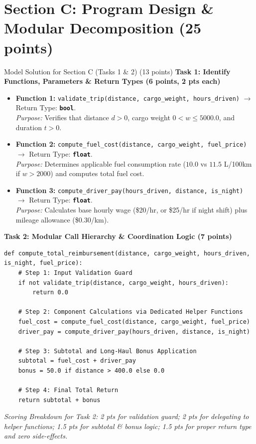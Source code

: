 \documentclass[11pt,a4paper]{article}
\begin{document}
\newpage

\section*{Section C: Program Design \& Modular Decomposition (25 points)}

\begin{solbox}{Model Solution for Section C (Tasks 1 \& 2) (13 points)}
\textbf{Task 1: Identify Functions, Parameters \& Return Types (6 points, 2 pts each)}
\begin{itemize}[leftmargin=2em, itemsep=2pt]
  \item \textbf{Function 1:} \texttt{validate\_trip(distance, cargo\_weight, hours\_driven)} $\rightarrow$ Return Type: \textbf{\texttt{bool}}.\\
    \textit{Purpose:} Verifies that distance $d > 0$, cargo weight $0 < w \le 5000.0$, and duration $t > 0$.
  \item \textbf{Function 2:} \texttt{compute\_fuel\_cost(distance, cargo\_weight, fuel\_price)} $\rightarrow$ Return Type: \textbf{\texttt{float}}.\\
    \textit{Purpose:} Determines applicable fuel consumption rate ($10.0$ vs $11.5$ L/100km if $w > 2000$) and computes total fuel cost.
  \item \textbf{Function 3:} \texttt{compute\_driver\_pay(hours\_driven, distance, is\_night)} $\rightarrow$ Return Type: \textbf{\texttt{float}}.\\
    \textit{Purpose:} Calculates base hourly wage (\$20/hr, or \$25/hr if night shift) plus mileage allowance (\$0.30/km).
\end{itemize}

\vspace{0.2cm}
\textbf{Task 2: Modular Call Hierarchy \& Coordination Logic (7 points)}
\begin{lstlisting}
def compute_total_reimbursement(distance, cargo_weight, hours_driven, is_night, fuel_price):
    # Step 1: Input Validation Guard
    if not validate_trip(distance, cargo_weight, hours_driven):
        return 0.0

    # Step 2: Component Calculations via Dedicated Helper Functions
    fuel_cost = compute_fuel_cost(distance, cargo_weight, fuel_price)
    driver_pay = compute_driver_pay(hours_driven, distance, is_night)

    # Step 3: Subtotal and Long-Haul Bonus Application
    subtotal = fuel_cost + driver_pay
    bonus = 50.0 if distance > 400.0 else 0.0

    # Step 4: Final Total Return
    return subtotal + bonus
\end{lstlisting}
\small
\textit{Scoring Breakdown for Task 2: 2 pts for validation guard; 2 pts for delegating to helper functions; 1.5 pts for subtotal \& bonus logic; 1.5 pts for proper return type and zero side-effects.}
\end{solbox}
\end{document}
